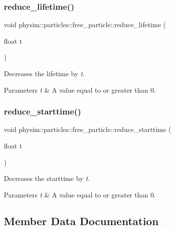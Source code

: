 \subsubsection{\texorpdfstring{reduce\+\_\+lifetime()}{reduce\_lifetime()}}
{\footnotesize\ttfamily void physim\+::particles\+::free\+\_\+particle\+::reduce\+\_\+lifetime (\begin{DoxyParamCaption}\item[{float}]{t }\end{DoxyParamCaption})}



Decreases the lifetime by {\itshape t}. 


\begin{DoxyParams}{Parameters}
{\em t} & A value equal to or greater than 0. \\
\hline
\end{DoxyParams}
\mbox{\label{classphysim_1_1particles_1_1free__particle_a8f024371fb279e75bbfef1be83bce4bc}} 
\subsubsection{\texorpdfstring{reduce\+\_\+starttime()}{reduce\_starttime()}}
{\footnotesize\ttfamily void physim\+::particles\+::free\+\_\+particle\+::reduce\+\_\+starttime (\begin{DoxyParamCaption}\item[{float}]{t }\end{DoxyParamCaption})}



Decreases the starttime by {\itshape t}. 


\begin{DoxyParams}{Parameters}
{\em t} & A value equal to or greater than 0. \\
\hline
\end{DoxyParams}


\subsection{Member Data Documentation}
\mbox{\label{classphysim_1_1particles_1_1free__particle_a0f6d69caeac140abd74c7be4ed55eb74}} 
